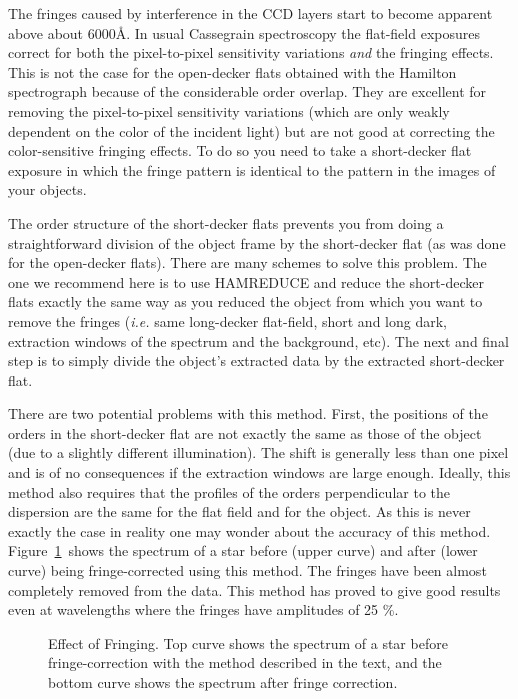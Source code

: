 The fringes caused by interference in the CCD layers start to become apparent
above about 6000\AA. In usual Cassegrain spectroscopy the flat-field
exposures correct for both the pixel-to-pixel sensitivity variations {\it and}
the fringing effects. This is not the case for the open-decker flats obtained
with the Hamilton spectrograph because of the considerable order overlap. They
are excellent for removing the pixel-to-pixel sensitivity variations (which
are only weakly dependent on the color of the incident light) but are not good
at correcting the color-sensitive fringing effects.  To do so you need to take
a short-decker flat exposure in which the fringe pattern is identical to
the pattern in the images of your objects.

The order structure of the short-decker flats prevents you from doing a
straightforward division of the object frame by the short-decker flat (as was
done for the open-decker flats). There are many schemes to solve this problem.
The one we recommend here is to use {\tenit HAMREDUCE} and reduce the
short-decker flats exactly the same way as you reduced the object from which
you want to remove the fringes ({\it i.e.} same long-decker flat-field, short
and long dark, extraction windows of the spectrum and the background, etc). The
next and final step is to simply divide the object's extracted data by the
extracted short-decker flat.

There are two potential problems with this method. First,
the positions of the orders in
the short-decker flat are not exactly the same as those of the object (due to
a slightly different illumination). The shift is generally less than
one pixel and is of no consequences if the extraction windows are large
enough. Ideally, this method also requires that
the profiles of the orders perpendicular to the dispersion are the same for
the flat field and for the object. As this is never exactly the case in
reality one may wonder about the accuracy of this method.
Figure~\ref{fig:hamfringes}\ shows the spectrum of a star before (upper curve)
and after (lower curve) being fringe-corrected using this method. The fringes
have been almost completely removed from the data. This method has proved to
give good results even at wavelengths where the fringes have amplitudes
of 25 \%.

\begin{figure}[t]
   \centering
   \vspace{4.0in}
   \caption[]{\label{fig:hamfringes} Effect of Fringing.  Top curve shows the
            spectrum of a star before fringe-correction with the method
            described in the text, and the bottom curve shows the spectrum
            after fringe correction.}
\end{figure}

